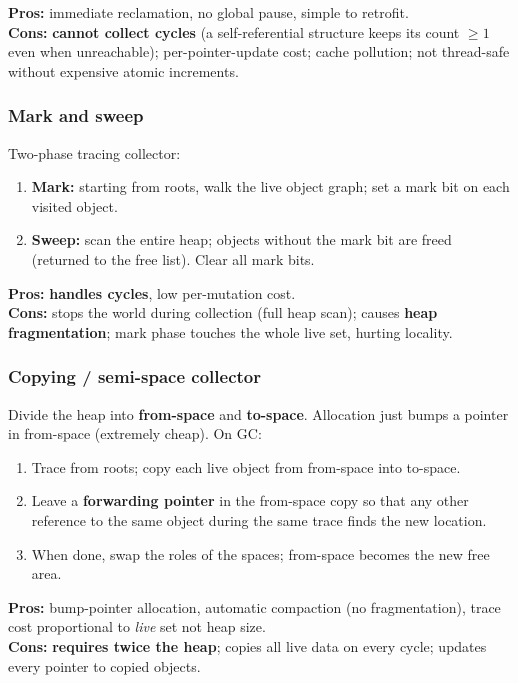 \documentclass[11pt,a4paper]{article}
\begin{document}
\textbf{Pros:} immediate reclamation, no global pause, simple to retrofit. \\
\textbf{Cons:} \textbf{cannot collect cycles} (a self-referential structure keeps its count $\geq 1$ even when unreachable); per-pointer-update cost; cache pollution; not thread-safe without expensive atomic increments.

\subsubsection*{Mark and sweep}

Two-phase tracing collector:
\begin{enumerate}[leftmargin=*,itemsep=0pt]
  \item \textbf{Mark:} starting from roots, walk the live object graph; set a mark bit on each visited object.
  \item \textbf{Sweep:} scan the entire heap; objects without the mark bit are freed (returned to the free list). Clear all mark bits.
\end{enumerate}

\textbf{Pros:} \textbf{handles cycles}, low per-mutation cost. \\
\textbf{Cons:} stops the world during collection (full heap scan); causes \textbf{heap fragmentation}; mark phase touches the whole live set, hurting locality.

\subsubsection*{Copying / semi-space collector}

Divide the heap into \textbf{from-space} and \textbf{to-space}. Allocation just bumps a pointer in from-space (extremely cheap). On GC:
\begin{enumerate}[leftmargin=*,itemsep=0pt]
  \item Trace from roots; copy each live object from from-space into to-space.
  \item Leave a \textbf{forwarding pointer} in the from-space copy so that any other reference to the same object during the same trace finds the new location.
  \item When done, swap the roles of the spaces; from-space becomes the new free area.
\end{enumerate}

\textbf{Pros:} bump-pointer allocation, automatic compaction (no fragmentation), trace cost proportional to \emph{live} set not heap size. \\
\textbf{Cons:} \textbf{requires twice the heap}; copies all live data on every cycle; updates every pointer to copied objects.
\end{document}
